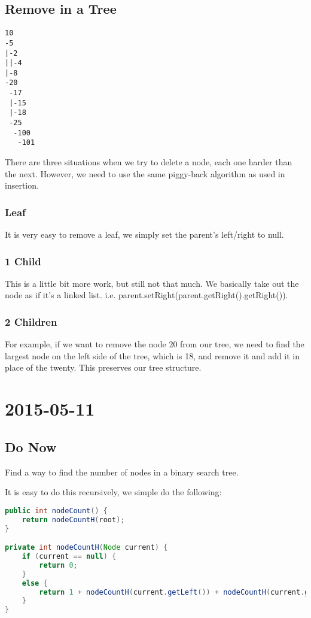 \documentclass [12 pt, twoside] {article}
\begin{document}
\subsection{Remove in a Tree}
\begin{lstlisting}
10
-5
|-2
||-4
|-8
-20
 -17
 |-15
 |-18
 -25
  -100
   -101
\end{lstlisting}
There are three situations when we try to delete a node, each one harder than
the next. However, we need to use the same piggy-back algorithm as used in
insertion.
\subsubsection{Leaf}
It is very easy to remove a leaf, we simply set the parent's left/right to null.

\subsubsection{1 Child}
This is a little bit more work, but still not that much. We basically take out
the node as if it's a linked list. i.e.
parent.setRight(parent.getRight().getRight()).

\subsubsection{2 Children}
For example, if we want to remove the node 20 from our tree, we need to find the
largest node on the left side of the tree, which is 18, and remove it and add it
in place of the twenty. This preserves our tree structure.

\section{2015-05-11}
\subsection{Do Now}
Find a way to find the number of nodes in a binary search tree.

It is easy to do this recursively, we simple do the following:

\begin{lstlisting}[language=java]
public int nodeCount() {
    return nodeCountH(root);
}

private int nodeCountH(Node current) {
    if (current == null) {
        return 0;
    }
    else {
        return 1 + nodeCountH(current.getLeft()) + nodeCountH(current.getRight());
    }
}
\end{lstlisting}
\end{document}

